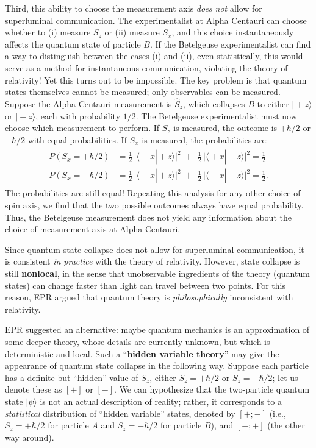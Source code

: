 \documentclass[pra,12pt]{revtex4}
\begin{document}
Third, this ability to choose the measurement axis \textit{does not}
allow for superluminal communication.  The experimentalist at Alpha
Centauri can choose whether to (i) measure $S_z$ or (ii) measure
$S_x$, and this choice instantaneously affects the quantum state of
particle $B$.  If the Betelgeuse experimentalist can find a way to
distinguish between the cases (i) and (ii), even statistically, this
would serve as a method for instantaneous communication, violating the
theory of relativity!  Yet this turns out to be impossible.  The key
problem is that quantum states themselves cannot be measured; only
observables can be measured.  Suppose the Alpha Centauri measurement
is $\hat{S}_z$, which collapses $B$ to either $|\!+\!z\rangle$ or
$|\!-\!z\rangle$, each with probability $1/2$.  The Betelgeuse
experimentalist must now choose which measurement to perform.  If
$S_z$ is measured, the outcome is $+\hbar/2$ or $-\hbar/2$ with equal
probabilities.  If $S_x$ is measured, the probabilities are:
\begin{align}
  \begin{aligned}P(S_x = +\hbar/2) &= \frac{1}{2}\, \Big|\langle\!+x|\!+\!z\rangle\Big|^2 \;+\;\, \frac{1}{2}\, \Big|\langle\!+x|\!-\!z\rangle\Big|^2 = \frac{1}{2}\\P(S_x = -\hbar/2) &= \frac{1}{2}\, \Big|\langle\!-x|\!+\!z\rangle\Big|^2 \;+\;\, \frac{1}{2}\, \Big|\langle\!-x|\!-\!z\rangle\Big|^2 = \frac{1}{2}.\end{aligned}
\end{align}
The probabilities are still equal!  Repeating this analysis for any
other choice of spin axis, we find that the two possible outcomes
always have equal probability.  Thus, the Betelgeuse measurement does
not yield any information about the choice of measurement axis at
Alpha Centauri.

Since quantum state collapse does not allow for superluminal
communication, it is consistent \textit{in practice} with the theory
of relativity.  However, state collapse is still \textbf{nonlocal}, in
the sense that unobservable ingredients of the theory (quantum states)
can change faster than light can travel between two points.  For this
reason, EPR argued that quantum theory is \textit{philosophically}
inconsistent with relativity.

EPR suggested an alternative: maybe quantum mechanics is an
approximation of some deeper theory, whose details are currently
unknown, but which is deterministic and local.  Such a
``\textbf{hidden variable theory}'' may give the appearance of
quantum state collapse in the following way.  Suppose each particle
has a definite but ``hidden'' value of $S_z$, either $S_z = +\hbar/2$
or $S_z = -\hbar/2$; let us denote these as $[+]$ or $[-]$.  We can
hypothesize that the two-particle quantum state $|\psi\rangle$ is not
an actual description of reality; rather, it corresponds to a
\textit{statistical} distribution of ``hidden variable'' states,
denoted by $[+;-]$ (i.e., $S_z = +\hbar/2$ for particle $A$ and $S_z =
-\hbar/2$ for particle $B$), and $[-;+]$ (the other way around).
\end{document}
